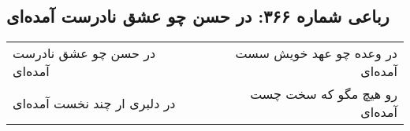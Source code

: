 \begin{center}
\section*{رباعی شماره ۳۶۶: در حسن چو عشق نادرست آمده‌ای}
\label{sec:sh366}
\begin{longtable}{l p{0.5cm} r}
در حسن چو عشق نادرست آمده‌ای
&&
در وعده چو عهد خویش سست آمده‌ای
\\
در دلبری ار چند نخست آمده‌ای
&&
رو هیچ مگو که سخت چست آمده‌ای
\\
\end{longtable}
\end{center}
